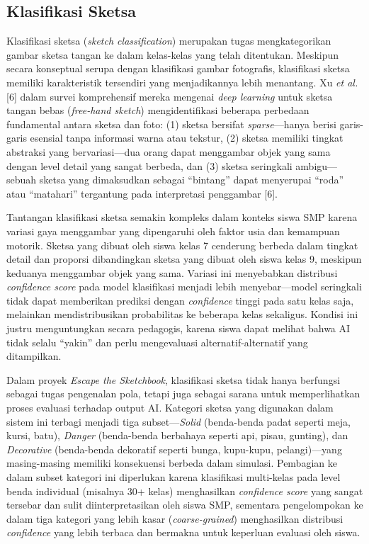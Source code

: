 \documentclass[12pt,oneside]{report}
\begin{document}
\subsection{Klasifikasi Sketsa}
\label{subsec:klasifikasi-sketsa}

Klasifikasi sketsa (\textit{sketch classification}) merupakan tugas mengkategorikan gambar sketsa tangan ke dalam kelas-kelas yang telah ditentukan. Meskipun secara konseptual serupa dengan klasifikasi gambar fotografis, klasifikasi sketsa memiliki karakteristik tersendiri yang menjadikannya lebih menantang. Xu \textit{et al.} [6] dalam survei komprehensif mereka mengenai \textit{deep learning} untuk sketsa tangan bebas (\textit{free-hand sketch}) mengidentifikasi beberapa perbedaan fundamental antara sketsa dan foto: (1) sketsa bersifat \textit{sparse}—hanya berisi garis-garis esensial tanpa informasi warna atau tekstur, (2) sketsa memiliki tingkat abstraksi yang bervariasi—dua orang dapat menggambar objek yang sama dengan level detail yang sangat berbeda, dan (3) sketsa seringkali ambigu—sebuah sketsa yang dimaksudkan sebagai ``bintang'' dapat menyerupai ``roda'' atau ``matahari'' tergantung pada interpretasi penggambar [6].

Tantangan klasifikasi sketsa semakin kompleks dalam konteks siswa SMP karena variasi gaya menggambar yang dipengaruhi oleh faktor usia dan kemampuan motorik. Sketsa yang dibuat oleh siswa kelas 7 cenderung berbeda dalam tingkat detail dan proporsi dibandingkan sketsa yang dibuat oleh siswa kelas 9, meskipun keduanya menggambar objek yang sama. Variasi ini menyebabkan distribusi \textit{confidence score} pada model klasifikasi menjadi lebih menyebar—model seringkali tidak dapat memberikan prediksi dengan \textit{confidence} tinggi pada satu kelas saja, melainkan mendistribusikan probabilitas ke beberapa kelas sekaligus. Kondisi ini justru menguntungkan secara pedagogis, karena siswa dapat melihat bahwa AI tidak selalu ``yakin'' dan perlu mengevaluasi alternatif-alternatif yang ditampilkan.

Dalam proyek \textit{Escape the Sketchbook}, klasifikasi sketsa tidak hanya berfungsi sebagai tugas pengenalan pola, tetapi juga sebagai sarana untuk memperlihatkan proses evaluasi terhadap output AI. Kategori sketsa yang digunakan dalam sistem ini terbagi menjadi tiga subset—\textit{Solid} (benda-benda padat seperti meja, kursi, batu), \textit{Danger} (benda-benda berbahaya seperti api, pisau, gunting), dan \textit{Decorative} (benda-benda dekoratif seperti bunga, kupu-kupu, pelangi)—yang masing-masing memiliki konsekuensi berbeda dalam simulasi. Pembagian ke dalam subset kategori ini diperlukan karena klasifikasi multi-kelas pada level benda individual (misalnya 30+ kelas) menghasilkan \textit{confidence score} yang sangat tersebar dan sulit diinterpretasikan oleh siswa SMP, sementara pengelompokan ke dalam tiga kategori yang lebih kasar (\textit{coarse-grained}) menghasilkan distribusi \textit{confidence} yang lebih terbaca dan bermakna untuk keperluan evaluasi oleh siswa.
\end{document}
